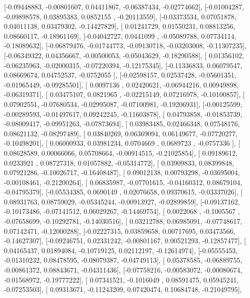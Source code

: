 \documentclass{article}
\begin{document}
       [-0.09448883, -0.00801607,  0.04411867, -0.06387434, -0.02774662],
       [-0.01004287, -0.09898578,  0.03895383,  0.0852155 , -0.20113559],
       [-0.03373534,  0.07051878,  0.04011138,  0.03479302, -0.14427829],
       [ 0.01241729,  0.01550231,  0.08813256,  0.08660117, -0.18961169],
       [-0.04042727,  0.0441099 , -0.05089788,  0.07734114, -0.18089632],
       [-0.06879476, -0.01744773, -0.09130718, -0.03203008, -0.11307235],
       [-0.06349322,  0.04356667, -0.00500053, -0.05043629, -0.18290588],
       [ 0.01356102, -0.06235963, -0.02000315, -0.07220394, -0.12175345],
       [-0.11336833,  0.06079547,  0.08669674,  0.04752537, -0.0752055 ],
       [-0.02598157,  0.02537428, -0.05601351, -0.01965449, -0.09285501],
       [ 0.0097136 ,  0.02420621, -0.06944216,  0.00949898, -0.06319371],
       [ 0.03475107,  0.0821965 , -0.02215149,  0.07216978, -0.10100857],
       [ 0.07902551, -0.07680534, -0.02995087, -0.07100981, -0.19206931],
       [-0.00125599, -0.00289593, -0.01497617,  0.09242245, -0.11603878],
       [ 0.04793858, -0.01853739, -0.08009417, -0.09951263, -0.07873694],
       [ 0.03983485,  0.02466348,  0.07548176,  0.08621132, -0.08297489],
       [ 0.03840269,  0.06369094,  0.06149677, -0.07720277, -0.10498201],
       [ 0.06000933,  0.03981234,  0.0704669 ,  0.0689723 , -0.0757336 ],
       [ 0.08628589,  0.00066066,  0.05708664, -0.00914515, -0.21025854],
       [ 0.09189612,  0.0233921 ,  0.08727318,  0.01057882, -0.05314772],
       [ 0.03909833,  0.08399848,  0.07921286, -0.10026717, -0.16408487],
       [ 0.09012138,  0.00793298, -0.03695004, -0.00108461, -0.21200264],
       [ 0.06835987, -0.07701615, -0.04160312,  0.08679104, -0.04795379],
       [-0.05534385,  0.0690149 ,  0.02076658,  0.09370615, -0.03337026],
       [ 0.08931763,  0.08759029, -0.05345244, -0.00913927, -0.02899859],
       [-0.09137162, -0.10173486, -0.07141512,  0.06029267, -0.14469754],
       [ 0.0022068 , -0.1005567 , -0.07658699, -0.10292781, -0.14030516],
       [ 0.03212788,  0.06985091, -0.07748617,  0.07142471, -0.12000288],
       [-0.02227315,  0.03859658,  0.00717695,  0.03473566, -0.14627307],
       [-0.09246751,  0.02331242, -0.00801167,  0.00521293, -0.12857477],
       [ 0.04165437,  0.01894084, -0.10719125,  0.02112197, -0.12614974],
       [-0.05555453, -0.01310232,  0.08478595, -0.08079387, -0.04749113],
       [ 0.05378585, -0.06889755, -0.00861372,  0.08843671, -0.04311436],
       [-0.07758216, -0.00583072, -0.00080674, -0.01568972, -0.19777222],
       [ 0.07341521, -0.1016049 ,  0.08591475,  0.05945241, -0.07253503],
       [ 0.09313671, -0.11243209,  0.07420474,  0.10684748, -0.21049795],
\end{document}

